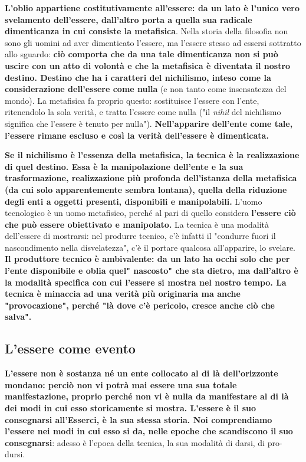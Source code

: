\textbf{L'oblio appartiene costitutivamente all'essere:
da un lato è l'unico vero svelamento dell'essere,
dall'altro porta a quella sua radicale dimenticanza
in cui consiste la metafisica}. Nella storia della
filosofia non sono gli uomini ad aver
dimenticato l'essere, ma l'essere stesso ad
essersi sottratto allo sguardo: \textbf{ciò comporta che da una tale dimenticanza non si può uscire
con un atto di volontà e che la metafisica
è diventata il nostro destino.
Destino che ha i caratteri del nichilismo, inteso
come la considerazione dell'essere come nulla}
(e non tanto come insensatezza del mondo). La metafisica fa proprio questo: sostituisce l'essere
con l'ente, ritenendolo la sola verità, e tratta
l'essere come nulla ("il \textit{nihil} del nichilismo
significa che l'essere è tenuto per nulla").
\textbf{Nell'apparire dell'ente come tale, l'essere rimane
escluso e così la verità dell'essere è dimenticata.}

\textbf{Se il nichilismo è l'essenza della metafisica,
la tecnica è la realizzazione di quel destino.
Essa è la manipolazione dell'ente e la sua
trasformazione, realizzazione più profonda
dell'istanza della metafisica (da cui solo apparentemente sembra lontana),
quella della riduzione degli enti a oggetti presenti,
disponibili e manipolabili.}
L'uomo tecnologico è un uomo metafisico, perché al
pari di quello considera \textbf{l'essere ciò che può essere
obiettivato e manipolato.}
La tecnica è una modalità dell'essere di
mostrarsi: nel produrre tecnico, c'è infatti il
"condurre fuori il nascondimento nella disvelatezza",
c'è il portare qualcosa all'apparire, lo svelare.
\textbf{Il produttore tecnico è ambivalente: da un lato
ha occhi solo che per l'ente disponibile e oblia
quel" nascosto" che sta dietro, ma dall'altro
è la modalità specifica con cui l'essere
si mostra nel nostro tempo. La tecnica
è minaccia ad una verità più originaria
ma anche "provocazione", perché "là dove c'è
pericolo, cresce anche ciò che salva".}

\subsection{L'essere come evento}


\textbf{L'essere non è sostanza né un ente collocato al di
là dell'orizzonte mondano: perciò non vi potrà
mai essere una sua totale manifestazione, proprio perché
non vi è nulla da manifestare al di là dei modi
in cui esso storicamente si mostra.
L'essere è il suo consegnarsi all'Esserci, è
la sua stessa storia. Noi comprendiamo l'essere nei
modi in cui esso si da, nelle epoche che scandiscono il
suo consegnarsi}: adesso è l'epoca della tecnica, la
sua modalità di darsi, di pro-dursi.

